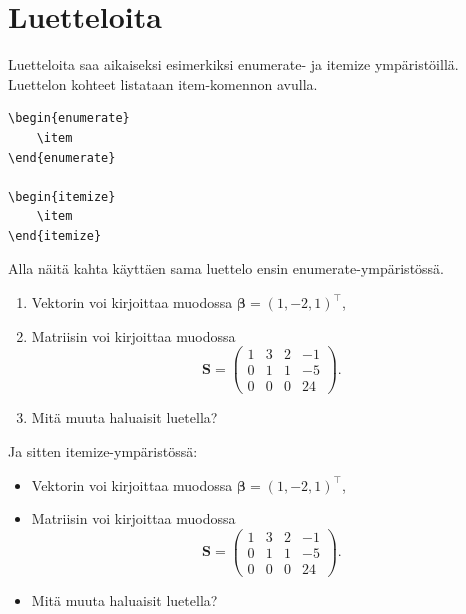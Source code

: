 \documentclass[a4paper,12 pt]{article}
\theoremstyle{plain}
\theoremstyle{definition}
\theoremstyle{remark}
\numberwithin{equation}{section}
\numberwithin{figure}{section}
\begin{document}
\section{Luetteloita}
Luetteloita saa aikaiseksi esimerkiksi enumerate- ja itemize ympäristöillä. Luettelon kohteet listataan item-komennon avulla.

\begin{verbatim}
\begin{enumerate}
    \item 
\end{enumerate}

\begin{itemize}
    \item 
\end{itemize}
\end{verbatim}
Alla näitä kahta käyttäen sama luettelo ensin enumerate-ympäristössä.

\begin{enumerate}

\item \label{eka1} Vektorin voi kirjoittaa muodossa $\boldsymbol{\beta}=(1,-2,1)^\top$,

\item Matriisin voi kirjoittaa muodossa 
\[
\boldsymbol{S}=\begin{pmatrix}
1 & 3 & 2 & -1 \\
0 & 1 & 1 & -5 \\
0 & 0 & 0 & 24 
\end{pmatrix}.
\]


\item Mitä muuta haluaisit luetella?

\end{enumerate}

\noindent Ja sitten itemize-ympäristössä:

\begin{itemize}

\item \label{eka} Vektorin voi kirjoittaa muodossa $\boldsymbol{\beta}=(1,-2,1)^\top$,

\item Matriisin voi kirjoittaa muodossa 
\[
\boldsymbol{S}=
\begin{pmatrix}
1 & 3 & 2 & -1 \\
0 & 1 & 1 & -5 \\
0 & 0 & 0 & 24 
\end{pmatrix}.
\]

\item Mitä muuta haluaisit luetella?

\end{itemize}
\end{document}
